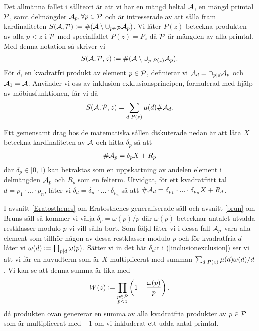 Det allmänna fallet i sållteori är att vi har en mängd heltal \(\A\), en mängd primtal \(\P\), samt delmängder \(\A_p, \forall p \in \P\) och är intresserade av att sålla fram kardinaliteten \(S(\A, \P) :=\card{(\A \setminus \cup_{p \in \P} \A_p)}\). Vi låter \(P(z)\) beteckna produkten av alla \(p < z\) i \(\P\) med specialfallet \(P(z) = P_z\) då \(\P\) är mängden av alla primtal. Med denna notation så skriver vi 
\begin{align*}
    \S{A}{P}{z} := \card{(\A \setminus \cup_{p \divides P(z)} \A_p)} .
\end{align*}
För \(d\), en kvadratfri produkt av element \(p \in \P\), definierar vi \(\A_d = \cap_{p \divides d} \A_p\) och \(\A_1 = \A\). Använder vi oss av inklusion-exklusionsprincipen, formulerad med hjälp av möbiusfunktionen, får vi då
\begin{align} \label{inclusionexclusion}
    \S{A}{P}{z} = \sum_{d \divides P(z)} \mu(d) \card{\A_d} .
\end{align} %

Ett gemensamt drag hos de matematiska sållen diskuterade nedan är att låta \(X\) beteckna kardinaliteten av \(\A\) och hitta \(\delta_p\) så att
\begin{align} \label{deltaX}
    \card{\A_p} = \delta_p X + R_p
\end{align}
där \(\delta_p \in [0, 1)\) kan betraktas som en uppskattning av andelen element i delmängden \(\A_p\) och \(R_p\) som en felterm. Utvidgat, för ett kvadratfritt tal \(d = p_1 \cdot ... \cdot p_n\), låter vi \(\delta_{d} = \delta_{p_1} \cdot ... \cdot \delta_{p_n}\) så att \(\card{\A_{d}} = \delta_{p_1} \cdot ... \cdot \delta_{p_n} X + R_{d}\). 

I avsnitt \ref{Eratosthenes} om Eratosthenes generaliserade såll och avsnitt \ref{brun} om Bruns såll så kommer vi välja \(\delta_p = \omega(p) / p\) där \(\omega(p)\) betecknar antalet utvalda restklasser modulo \(p\) vi vill sålla bort. Som följd låter vi i dessa fall \(\A_p\) vara alla element som tillhör någon av dessa restklasser modulo $p$ och för kvadratfria $d$ låter vi \(\omega(d) := \prod_{p \divides d} \omega(p)\).  Sätter vi in det här $\delta_d$:t i (\ref{inclusionexclusion}) ser vi att vi får en huvudterm som är $X$ multiplicerat med summan \(\sum_{d \divides P(z)} \mu(d) \omega(d)/d\). Vi kan se att denna summa är lika med
\begin{align} \label{Wfunc}
    W(z) := \prod_{\substack{p \in \P \\ p < z}}\left(1 - \frac{\omega(p)}{p}\right).
\end{align} 
då produkten ovan genererar en summa av alla kvadratfria produkter av \(p \in \P\) som är multiplicerat med $-1$ om vi inkluderat ett udda antal primtal.

